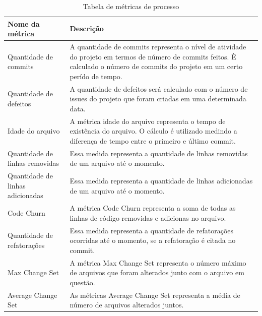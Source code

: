 \begin{table}[]
\centering
\caption{Tabela de métricas de processo}
\label{my-label}
\begin{tabular}{|p{3cm}|p{12cm}|}
\hline
Nome da métrica                  & Descrição                                                                                                                                                                         \\ \hline
Quantidade de commits            & A quantidade de commits representa o nível de atividade do projeto em termos de número de commits feitos. È calculado o número de commits do projeto em um certo perído de tempo. \\ \hline
Quantidade de defeitos           & A quantidade de defeitos será calculado com o número de issues do projeto que foram criadas em uma determinada data.                                                              \\ \hline
Idade do arquivo             & A métrica idade do arquivo representa o tempo de existência do arquivo. O cálculo é utilizado medindo a diferença de tempo entre o primeiro e último commit.                  \\ \hline
Quantidade de linhas removidas   & Essa medida representa a quantidade de linhas removidas de um arquivo até o momento.                                                                                              \\ \hline
Quantidade de linhas adicionadas & Essa medida representa a quantidade de linhas adicionadas de um arquivo até o momento.                                                                                            \\ \hline
Code Churn                       & A métrica Code Churn representa a soma de todas as linhas de código removidas e adicionas no arquivo.                                                                             \\ \hline
Quantidade de refatorações       & Essa medida representa a quantidade de refatorações ocorridas até o momento, se a refatoração é citada no commit.                                                                 \\ \hline
Max Change Set                   & A métrica Max Change Set representa o número máximo de arquivos que foram alterados junto com o arquivo em questão.                                                               \\ \hline
Average Change Set               & As métricas Average Change Set representa a média de número de arquivos alterados juntos.                                                                                         \\ \hline
\end{tabular}
\end{table}
